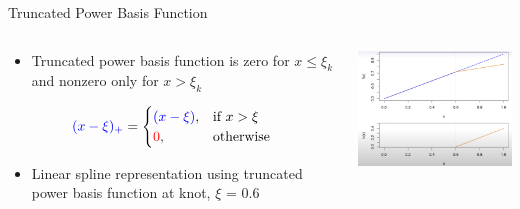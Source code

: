 \documentclass[english]{beamer}
\newcommand{\alertblue}[1]{{\color{blue}#1}}
\begin{document}
\begin{frame}{Truncated Power Basis Function}
 \begin{columns}
     \begin{column}{0.5\textwidth} 
         \begin{itemize}
             \item Truncated power basis function is \alertblue{zero} for \alertblue{\( x \leq \xi_k \)} and \alertblue{nonzero} only for \alertblue{\( x > \xi_k \)}
         \end{itemize}
         \begin{equation*}
             \alertblue{(x - \xi)_+} =
             \begin{cases}
                 \alertblue{(x - \xi)}, & \text{if } x > \xi \\
                 \textcolor{red}{0}, & \text{otherwise}
             \end{cases}
         \end{equation*}
         \begin{itemize}
             \item Linear spline representation using truncated power basis function at \alertblue{knot, \(\xi\) = 0.6}
         \end{itemize}
     \end{column}
     \begin{column}{0.6\textwidth} 
         \centering
         \includegraphics[width=6.5cm,keepaspectratio]{images/truncated_linear.png}
     \end{column}
 \end{columns}
\end{frame}
\end{document}

